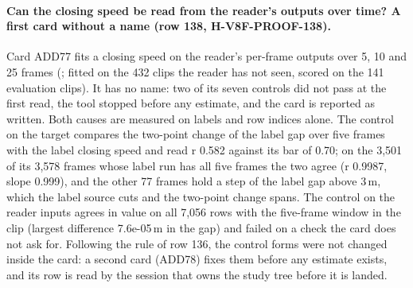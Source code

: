 \paragraph{Can the closing speed be read from the reader's outputs over time? A first card without a name (row 138, H-V8F-PROOF-138).} Card ADD77 fits a closing speed on the reader's per-frame outputs over 5, 10 and 25 frames (; fitted on the 432 clips the reader has not seen, scored on the 141 evaluation clips). It has no name: two of its seven controls did not pass at the first read, the tool stopped before any estimate, and the card is reported as written. Both causes are measured on labels and row indices alone. The control on the target compares the two-point change of the label gap over five frames with the label closing speed and read r 0.582 against its bar of 0.70; on the 3,501 of its 3,578 frames whose label run has all five frames the two agree (r 0.9987, slope 0.999), and the other 77 frames hold a step of the label gap above 3\,m, which the label source cuts and the two-point change spans. The control on the reader inputs agrees in value on all 7,056 rows with the five-frame window in the clip (largest difference 7.6e-05\,m in the gap) and failed on a check the card does not ask for. Following the rule of row 136, the control forms were not changed inside the card: a second card (ADD78) fixes them before any estimate exists, and its row is read by the session that owns the study tree before it is landed.

